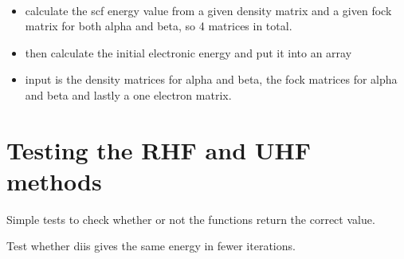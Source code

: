 \documentclass[letterpaper,10pt,english]{sphinxmanual}
\begin{document}
\begin{fulllineitems}
\label{\detokenize{SCF_functions:ghf.SCF_functions.uhf_scf_energy}}~\begin{itemize}
\item {} 
calculate the scf energy value from a given density matrix and a given fock matrix for both alpha and beta,
so 4 matrices in total.

\item {} 
then calculate the initial electronic energy and put it into an array

\item {} 
input is the density matrices for alpha and beta, the fock matrices for alpha and beta and lastly a one electron
matrix.

\end{itemize}

\end{fulllineitems}

\label{\detokenize{tests:module-ghf.tests.test_auth}}

\chapter{Testing the RHF and UHF methods}
\label{\detokenize{tests:testing-the-rhf-and-uhf-methods}}\label{\detokenize{tests::doc}}
Simple tests to check whether or not the functions return the correct value.

\begin{fulllineitems}
\label{\detokenize{tests:ghf.tests.test_auth.test_diis_real_ghf}}
Test whether diis gives the same energy in fewer iterations.

\end{fulllineitems}

\end{document}
